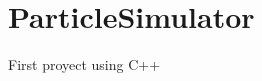 \chapter{Particle\+Simulator}
\hypertarget{md__r_e_a_d_m_e}{}\label{md__r_e_a_d_m_e}
\label{md__r_e_a_d_m_e_autotoc_md0}%
%


First proyect using C++ 